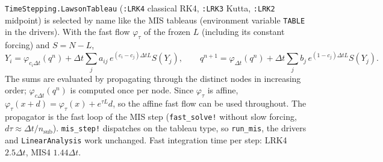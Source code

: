 \documentclass[11pt,a4paper]{article}
\newcommand{\code}[1]{\texttt{#1}}
\newcommand{\dt}{\Delta t}
\begin{document}
\code{TimeStepping.LawsonTableau} (\code{:LRK4} classical RK4, \code{:LRK3} Kutta, \code{:LRK2}
midpoint) is selected by name like the MIS tableaus (environment variable \code{TABLE} in the
drivers). With the fast flow $\varphi_\tau$ of the frozen $L$ (including its constant forcing) and
$S = N - L$,
\begin{equation}
  Y_i = \varphi_{c_i\dt}(q^n) + \dt\sum_j a_{ij}\,e^{(c_i-c_j)\dt L}S(Y_j),\qquad
  q^{n+1} = \varphi_{\dt}(q^n) + \dt\sum_j b_j\,e^{(1-c_j)\dt L}S(Y_j).
\end{equation}
The sums are evaluated by propagating through the distinct nodes in increasing order;
$\varphi_{c\dt}(q^n)$ is computed once per node. Since $\varphi_\tau$ is affine, $\varphi_\tau(x+d) =
\varphi_\tau(x) + e^{\tau L}d$, so the affine fast flow can be used throughout. The propagator is the
fast loop of the MIS step (\code{fast\_solve!} without slow forcing, $d\tau\approx\dt/n_\mathrm{sub}$).
\code{mis\_step!} dispatches on the tableau type, so \code{run\_mis}, the drivers and
\code{LinearAnalysis} work unchanged. Fast integration time per step: LRK4 $2.5\dt$, MIS4 $1.44\dt$.
\end{document}
